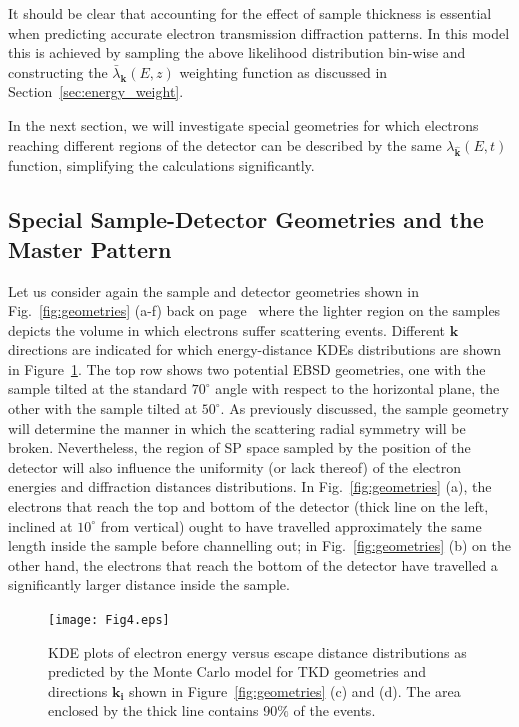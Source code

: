 It should be clear that accounting for the effect of sample thickness is essential when predicting accurate electron transmission diffraction patterns. In this model this is achieved by sampling the above likelihood distribution bin-wise and constructing the $\bar{\lambda}_{\mathbf{k}}(E,z)$ weighting function as discussed in Section~\ref{sec:energy_weight}.

In the next section, we will investigate special geometries for which electrons reaching different regions of the detector can be described by the same $\lambda_{\hat{\mathbf{k}}}(E,t)$ function, simplifying the calculations significantly. 



%
\subsection{Special Sample-Detector Geometries and the Master Pattern}
\label{sec:geom}


Let us consider again the sample and detector geometries shown in Fig.~\ref{fig:geometries} (a-f) back on page~\pageref{fig:geometries} where the lighter region on the samples depicts the volume in which electrons suffer scattering events.  Different $\mathbf{k}$ directions are indicated for which energy-distance KDEs distributions are shown in Figure~\ref{fig:ks}.  The top row shows two potential EBSD geometries, one with the sample tilted at the standard $70^{\circ}$ angle with respect to the horizontal plane, the other with the sample tilted at $50^{\circ}$. As previously discussed, the sample geometry will determine the manner in which the scattering radial symmetry will be broken. Nevertheless, the region of SP space sampled by the position of the detector will also influence the uniformity (or lack thereof) of the electron energies and diffraction distances distributions. In Fig.~\ref{fig:geometries} (a), the electrons that reach the top and bottom of the detector (thick line on the left, inclined at $10^{\circ}$ from vertical) ought to have travelled approximately the same length inside the sample before channelling out; in Fig.~\ref{fig:geometries} (b) on the other hand, the electrons that reach the bottom of the detector have travelled a significantly larger distance inside the sample. 

\begin{figure}[ht]
\centering\leavevmode
\texttt{[image: Fig4.eps]}%
\caption[KDE plots of electron energy versus escape distance distributions]{KDE plots of electron energy versus escape distance distributions as predicted by the Monte Carlo model for TKD geometries and directions $\mathbf{k_i}$ shown in Figure~\ref{fig:geometries} (c) and (d). The area enclosed by the thick line contains 90$\%$ of the events.}
\label{fig:ks}
\end{figure}

